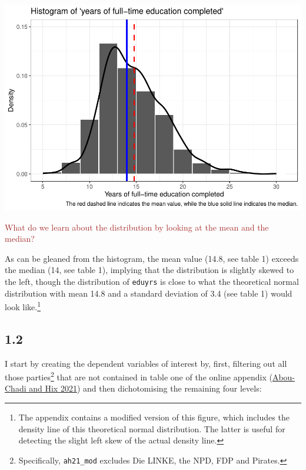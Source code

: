 \documentclass[
]{article}
\begin{document}
\begin{center}\includegraphics{AVCD-Assignment1-Edenhofer_files/figure-latex/distribution-eduyears-1} \end{center}

\textcolor{brown}{What do we learn about the distribution by looking at the mean and the median?}

As can be gleaned from the histogram, the mean value (14.8, see table 1)
exceeds the median (14, see table 1), implying that the distribution is
slightly skewed to the left, though the distribution of \texttt{eduyrs}
is close to what the theoretical normal distribution with mean 14.8 and
a standard deviation of 3.4 (see table 1) would look like.\footnote{The
  appendix contains a modified version of this figure, which includes
  the density line of this theoretical normal distribution. The latter
  is useful for detecting the slight left skew of the actual density
  line.}

\hypertarget{section-1}{%
\subsection{1.2}\label{section-1}}

I start by creating the dependent variables of interest by, first,
filtering out all those parties\footnote{Specifically,
  \texttt{ah21\_mod} excludes Die LINKE, the NPD, FDP and Pirates.} that
are not contained in table one of the online appendix
(\protect\hyperlink{ref-abou-chadi_brahmin_2021}{Abou-Chadi and Hix
2021}) and then dichotomising the remaining four levels:
\end{document}

